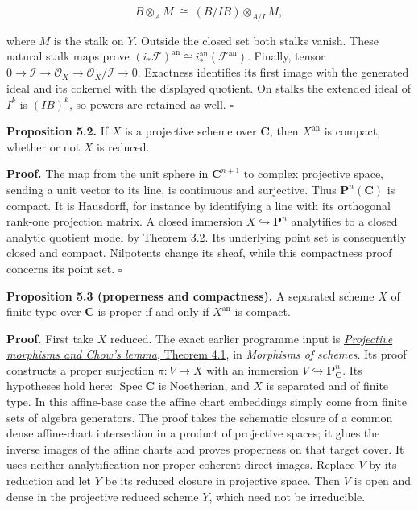 \documentclass[11pt]{article}
\begin{document}
\[
B\otimes_A M
\ \cong\ (B/IB)\otimes_{A/I}M,
\]

where \(M\) is the stalk on \(Y\). Outside the closed set both stalks
vanish. These natural stalk maps prove
\((i_*\mathcal F)^{\mathrm{an}}\cong i^{\mathrm{an}}_*(\mathcal F^{\mathrm{an}})\).
Finally, tensor
\(0\to\mathcal I\to\mathcal O_X\to\mathcal O_X/\mathcal I\to0\).
Exactness identifies its first image with the generated ideal and its
cokernel with the displayed quotient. On stalks the extended ideal of
\(I^k\) is \((IB)^k\), so powers are retained as well. \(\square\)

\textbf{Proposition 5.2.} If \(X\) is a projective scheme over
\(\mathbf C\), then \(X^{\mathrm{an}}\) is compact, whether or not \(X\)
is reduced.

\textbf{Proof.} The map from the unit sphere in \(\mathbf C^{n+1}\) to
complex projective space, sending a unit vector to its line, is
continuous and surjective. Thus \(\mathbf P^n(\mathbf C)\) is compact.
It is Hausdorff, for instance by identifying a line with its orthogonal
rank-one projection matrix. A closed immersion
\(X\hookrightarrow\mathbf P^n\) analytifies to a closed analytic
quotient model by Theorem 3.2. Its underlying point set is consequently
closed and compact. Nilpotents change its sheaf, while this compactness
proof concerns its point set. \(\square\)

\textbf{Proposition 5.3 (properness and compactness).} A separated
scheme \(X\) of finite type over \(\mathbf C\) is proper if and only if
\(X^{\mathrm{an}}\) is compact.

\textbf{Proof.} First take \(X\) reduced. The exact earlier programme
input is
\href{https://github.com/KokunoYumeto/open-math-courses/blob/d18141573d82588960ab175843821f0b38ab8802/docs/courses/AG-GS/prerequisites/AG-MO/src/projective-morphisms-and-chows-lemma.md}{\emph{Projective
morphisms and Chow's lemma}, Theorem 4.1}, in \emph{Morphisms of
schemes}. Its proof constructs a proper surjection \(\pi:V\to X\) with
an immersion \(V\hookrightarrow\mathbf P^n_{\mathbf C}\). Its hypotheses
hold here: \(\operatorname{Spec}\mathbf C\) is Noetherian, and \(X\) is
separated and of finite type. In this affine-base case the affine chart
embeddings simply come from finite sets of algebra generators. The proof
takes the schematic closure of a common dense affine-chart intersection
in a product of projective spaces; it glues the inverse images of the
affine charts and proves properness on that target cover. It uses
neither analytification nor proper coherent direct images. Replace \(V\)
by its reduction and let \(Y\) be its reduced closure in projective
space. Then \(V\) is open and dense in the projective reduced scheme
\(Y\), which need not be irreducible.
\end{document}
